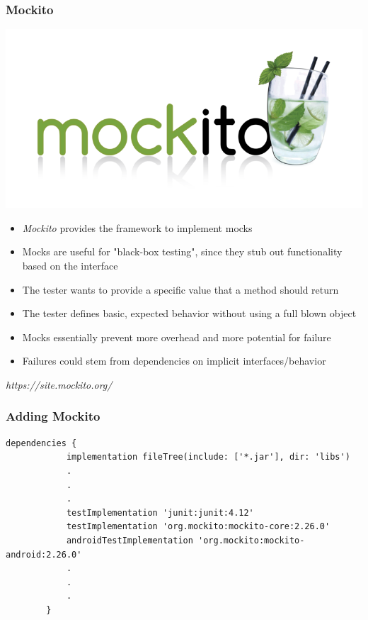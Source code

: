 \documentclass[10pt]{beamer}
\begin{document}
\begin{frame}
    \frametitle{Mockito}
    \center\includegraphics[scale=0.15]{3rd_party/mockito_2x}
    \begin{itemize}
        \item \textit{Mockito} provides the framework to implement mocks
        \item Mocks are useful for "black-box testing", since they stub out functionality based on
        the interface
        \item The tester wants to provide a specific value that a method should return
        \item The tester defines basic, expected behavior without using a full blown object
        \item Mocks essentially prevent more overhead and more potential for failure
        \item Failures could stem from dependencies on implicit interfaces/behavior
    \end{itemize}
    \tiny\emph{https://site.mockito.org/}
\end{frame}

\begin{frame}[fragile]
    \frametitle{Adding Mockito}
    \begin{lstlisting}[caption={build.gradle}]
        dependencies {
            implementation fileTree(include: ['*.jar'], dir: 'libs')
            .
            .
            .
            testImplementation 'junit:junit:4.12'
            testImplementation 'org.mockito:mockito-core:2.26.0'
            androidTestImplementation 'org.mockito:mockito-android:2.26.0'
            .
            .
            .
        }
    \end{lstlisting}
\end{frame}
\end{document}
